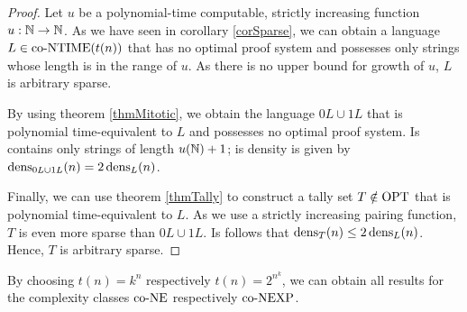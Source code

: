   \begin{proof}
    Let \(u\) be a polynomial-time computable, strictly increasing function \(u:\mathbb{N}\to\mathbb{N}\). As we have seen in corollary \ref{corSparse}, we can obtain a language \(L \in \text{co-NTIME}(t(n))\) that has no optimal proof system and possesses only strings whose length is in the range of \(u\). As there is no upper bound for growth of \(u\), \(L\) is arbitrary sparse. 
    
    By using theorem \ref{thmMitotic}, we obtain the language \(0L \cup 1L\) that is polynomial time-equivalent to \(L\) and possesses no optimal proof system. Is contains only strings of length \(u(\mathbb{N}) + 1\); is density is given by \(\operatorname{dens}_{0L \cup 1L}(n) = 2\operatorname{dens}_{L}(n)\). 
    
    Finally, we can use theorem \ref{thmTally} to construct a tally set \(T \notin \text{OPT}\) that is polynomial time-equivalent to \(L\). As we use a strictly increasing pairing function, \(T\) is even more sparse than \(0L \cup 1L\). Is follows that \(\operatorname{dens}_T(n) \leq 2\operatorname{dens}_L(n)\). Hence, \(T\) is arbitrary sparse.
  \end{proof}
  
  By choosing \(t(n) = k^n\) respectively \(t(n) = 2^{n^k}\), we can obtain all results for the complexity classes \(\text{co-NE}\) respectively \(\text{co-NEXP}\).



 

  